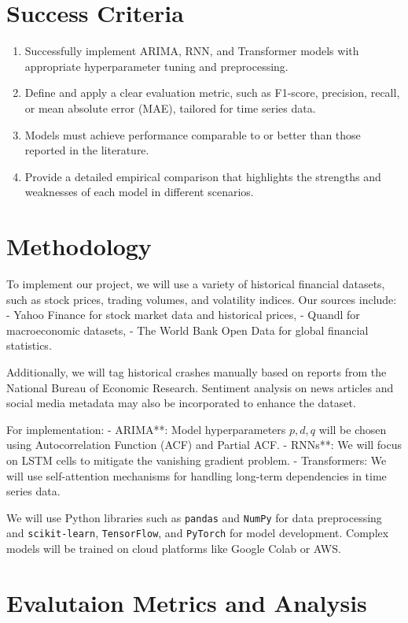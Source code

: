 \documentclass[12pt, letterpaper]{article}
\begin{document}
\section*{Success Criteria}
        \begin{enumerate}[label=-]
            \item Successfully implement ARIMA, RNN, and Transformer models with appropriate hyperparameter tuning and preprocessing.
            \item Define and apply a clear evaluation metric, such as F1-score, precision, recall, or mean absolute error (MAE), tailored for time series data.
            \item Models must achieve performance comparable to or better than those reported in the literature.
            \item Provide a detailed empirical comparison that highlights the strengths and weaknesses of each model in different scenarios.
        \end{enumerate}
\section*{Methodology}
        To implement our project, we will use a variety of historical financial datasets, such as stock prices, trading volumes, and volatility indices. Our sources include:
        - Yahoo Finance for stock market data and historical prices,
        - Quandl for macroeconomic datasets,
        - The World Bank Open Data for global financial statistics.

        Additionally, we will tag historical crashes manually based on reports from the National Bureau of Economic Research. Sentiment analysis on news articles and social media metadata may also be incorporated to enhance the dataset.

        For implementation:
        - ARIMA**: Model hyperparameters \( p, d, q \) will be chosen using Autocorrelation Function (ACF) and Partial ACF.
        - RNNs**: We will focus on LSTM cells to mitigate the vanishing gradient problem.
        - Transformers: We will use self-attention mechanisms for handling long-term dependencies in time series data.

        We will use Python libraries such as \texttt{pandas} and \texttt{NumPy} for data preprocessing and \texttt{scikit-learn}, \texttt{TensorFlow}, and \texttt{PyTorch} for model development. Complex models will be trained on cloud platforms like Google Colab or AWS.
\section*{Evalutaion Metrics and Analysis}
\end{document}
